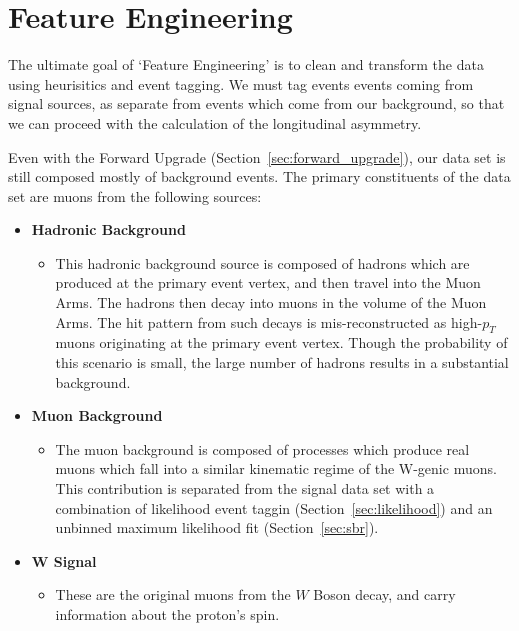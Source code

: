 \chapter{Feature Engineering}
\label{ch:feature_engineering}
The ultimate goal of `Feature Engineering' is to clean and transform the data
using heurisitics and event tagging. We must tag events events coming from
signal sources, as separate from events which come from our background, so that
we can proceed with the calculation of the longitudinal asymmetry.

Even with the Forward Upgrade (Section~\ref{sec:forward_upgrade}), our data set
is still composed mostly of background events. The primary constituents of the
data set are muons from the following sources:

\begin{itemize}
  \item \textbf{Hadronic Background}
    \begin{itemize}
      \item This hadronic background source is composed of hadrons which are
        produced at the primary event vertex, and then travel into the Muon
        Arms. The hadrons then decay into muons in the volume of the Muon Arms.
        The hit pattern from such decays is mis-reconstructed as high-$p_T$
        muons originating at the primary event vertex. Though the probability of
        this scenario is small, the large number of hadrons results in a
        substantial background. 
    \end{itemize}
  \item \textbf{Muon Background}
    \begin{itemize}
        \item The muon background is composed of processes which produce real
          muons which fall into a similar kinematic regime of the W-genic muons.
          This contribution is separated from the signal data set with a
          combination of likelihood event taggin (Section~\ref{sec:likelihood})
          and an unbinned maximum likelihood fit (Section~\ref{sec:sbr}).
    \end{itemize}
  \item \textbf{W Signal}
    \begin{itemize}
        \item These are the original muons from the $W$ Boson decay, and carry
          information about the proton's spin.
    \end{itemize}
\end{itemize}

